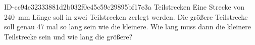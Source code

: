 \begin{exercise}
      {ID-cc94e32333881d2b032f0e45c59c29895bf17e3a}
      {Teilstrecken}
  \ifproblem\problem
    Eine Strecke von \SI{240}{\milli\metre} Länge soll in zwei Teilstrecken zerlegt werden.
    Die größere Teilstrecke soll genau 47 mal so lang sein wie die kleinere.
    Wie lang muss dann die kleinere Teilstrecke sein und wie lang die größere?
  \fi
\end{exercise}
